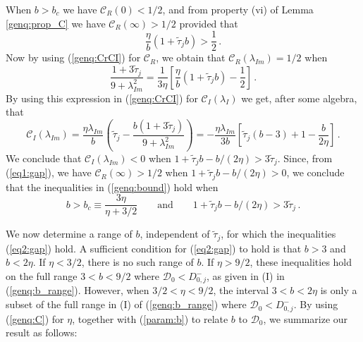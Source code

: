 \documentclass{article}%
\newcommand{\dzjm}{D^{-}_{0,j}}
\begin{document}
When $b>b_c$ we have ${\mathcal C}_R(0)<1/2$, and from property (vi)
of Lemma \ref{genq:prop_C} we have ${\mathcal C}_R(\infty)>{1/2}$
provided that
\begin{equation}\label{eq1:gap}
   \frac{\eta}{b} \left(1+ \tilde{\tau}_j b\right) > \frac{1}{2}\,.
\end{equation}
Now by using (\ref{genq:CrCI}) for ${\mathcal C}_R$, we obtain that
${\mathcal C}_R(\lambda_{Im})={1/2}$ when
\begin{equation*}
     \frac{1+3\tilde{\tau}_j}{9+\lambda_{Im}^2} = \frac{1}{3\eta} \left[
   \frac{\eta}{b} (1+\tilde{\tau}_j b) - \frac{1}{2}\right]\,.
\end{equation*}
By using this expression in (\ref{genq:CrCI}) for ${\mathcal
  C}_I(\lambda_I)$ we get, after some algebra, that
\begin{equation*}
    {\mathcal C_{I}}(\lambda_{Im}) = \frac{\eta \lambda_{Im}}{b} \left(
  \tilde{\tau}_j - \frac{b (1+3\tilde{\tau}_j)}{9+\lambda_{Im}^2} \right)
  = -\frac{\eta \lambda_{Im}}{3b} \left[ \tilde{\tau}_j (b-3) + 1 - 
  \frac{b}{2\eta} \right] \,.
\end{equation*}
We conclude that ${\mathcal C_{I}}(\lambda_{Im})<0$ when
$1+\tilde{\tau}_j b - {b/(2\eta)}>3\tilde{\tau}_j$. 
Since, from (\ref{eq1:gap}),  we have ${\mathcal C}_R(\infty)>{1/2}$ when
$1+\tilde{\tau}_j b - {b/(2\eta)}>0$, we conclude that the inequalities in 
(\ref{genq:bound}) hold when
\begin{equation}\label{eq2:gap}
   b>b_c \equiv \frac{3\eta}{\eta + {3/2}} \qquad \mbox{and} \qquad
1+\tilde{\tau}_j b - {b/(2\eta)}>3 \tilde{\tau}_j \,.
\end{equation}

We now determine a range of $b$, independent of $\tilde{\tau}_j$, for
which the inequalities (\ref{eq2:gap}) hold.  A sufficient condition
for (\ref{eq2:gap}) to hold is that $b>3$ and $b<2\eta$. If
$\eta<{3/2}$, there is no such range of $b$. If $\eta>{9/2}$, 
these inequalities hold on the full range $3<b<{9/2}$ where ${\mathcal
  D}_0<\dzjm$, as given in (I) in (\ref{genq:b_range}). However, when
${3/2}<\eta<{9/2}$, the interval $3<b<2\eta$ is only a subset of the
full range in (I) of (\ref{genq:b_range}) where ${\mathcal
  D}_0<\dzjm$.  By using (\ref{genq:C}) for $\eta$, together with
(\ref{param:b}) to relate $b$ to ${\mathcal D}_0$, we summarize our
result as follows:
\end{document}
